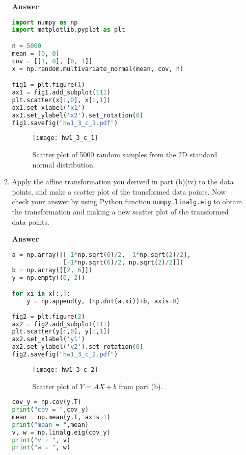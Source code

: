 \documentclass[11pt]{article}
\begin{document}
\begin{enumerate}[label=(\alph*)]
\begin{enumerate}[label=(\roman*)]
\noindent\textbf{Answer}

\begin{lstlisting}[language=Python, showstringspaces=false]
import numpy as np
import matplotlib.pyplot as plt

n = 5000
mean = [0, 0]
cov = [[1, 0], [0, 1]]
x = np.random.multivariate_normal(mean, cov, n)

fig1 = plt.figure(1)
ax1 = fig1.add_subplot(111)
plt.scatter(x[:,0], x[:,1])
ax1.set_xlabel('x1')
ax1.set_ylabel('x2').set_rotation(0)
fig1.savefig("hw1_3_c_1.pdf")  
\end{lstlisting}

\begin{figure}[H]
\centering
\texttt{[image: hw1\_3\_c\_1]}
\caption{Scatter plot of 5000 random samples from the 2D standard normal distribution.}
\label{fig: hw1_3_c_1}
\end{figure}

\item Apply the affine transformation you derived in part (b)(iv) to the data points, and make a scatter plot of the transformed data points. Now check your answer by using Python function \texttt{numpy.linalg.eig} to obtain the transformation and making a new scatter plot of the transformed data points.

\noindent\textbf{Answer}

\begin{lstlisting}[language=Python, showstringspaces=false]
a = np.array([[-1*np.sqrt(6)/2, -1*np.sqrt(2)/2],
              [-1*np.sqrt(6)/2, np.sqrt(2)/2]]) 
b = np.array([[2, 6]]) 
y = np.empty((0, 2))

for xi in x[:,]:
    y = np.append(y, (np.dot(a,xi))+b, axis=0)
    
fig2 = plt.figure(2)
ax2 = fig2.add_subplot(111)
plt.scatter(y[:,0], y[:,1])
ax2.set_xlabel('y1')
ax2.set_ylabel('y2').set_rotation(0)
fig2.savefig("hw1_3_c_2.pdf")
\end{lstlisting}

\begin{figure}[H]
\centering
\texttt{[image: hw1\_3\_c\_2]}
\caption{Scatter plot of $Y=AX+b$ from part (b).}
\label{fig: hw1_3_c_2}
\end{figure}

\begin{lstlisting}[language=Python, showstringspaces=false]
cov_y = np.cov(y.T)
print("cov = ",cov_y)
mean = np.mean(y.T, axis=1)
print("mean = ",mean)
v, w = np.linalg.eig(cov_y)
print("v = ", v)
print("w = ", w)
\end{lstlisting}


\end{enumerate}
\end{enumerate}
\end{document}
